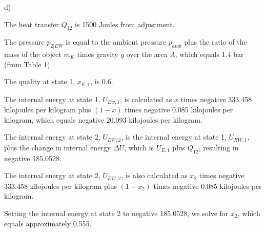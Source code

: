 d)

The heat transfer \( Q_{12} \) is 1500 Joules from adjustment.

The pressure \( p_{2|EW} \) is equal to the ambient pressure \( p_{amb} \) plus the ratio of the mass of the object \( m_{K} \) times gravity \( g \) over the area \( A \), which equals 1.4 bar (from Table 1).

The quality at state 1, \( x_{E,1} \), is 0.6.

The internal energy at state 1, \( U_{Ew,1} \), is calculated as \( x \) times negative 333.458 kilojoules per kilogram plus \( (1 - x) \) times negative 0.085 kilojoules per kilogram, which equals negative 20.093 kilojoules per kilogram.

The internal energy at state 2, \( U_{EW,2} \), is the internal energy at state 1, \( U_{EW,1} \), plus the change in internal energy \( \Delta U \), which is \( U_{E,1} \) plus \( Q_{12} \), resulting in negative 185.0528.

The internal energy at state 2, \( U_{EW,2} \), is also calculated as \( x_2 \) times negative 333.458 kilojoules per kilogram plus \( (1 - x_2) \) times negative 0.085 kilojoules per kilogram.

Setting the internal energy at state 2 to negative 185.0528, we solve for \( x_2 \), which equals approximately 0.555.